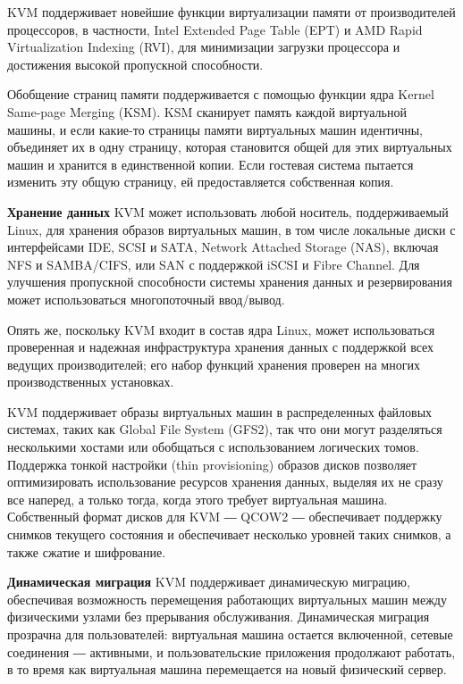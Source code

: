 KVM поддерживает новейшие функции виртуализации памяти от производителей процессоров, в частности, Intel Extended Page Table (EPT) и AMD Rapid Virtualization Indexing (RVI), для минимизации загрузки процессора и достижения высокой пропускной способности.

Обобщение страниц памяти поддерживается с помощью функции ядра Kernel Same-page Merging (KSM). KSM сканирует память каждой виртуальной машины, и если какие-то страницы памяти виртуальных машин идентичны, объединяет их в одну страницу, которая становится общей для этих виртуальных машин и хранится в единственной копии. Если гостевая система пытается изменить эту общую страницу, ей предоставляется собственная копия.

\textbf{Хранение данных}
KVM может использовать любой носитель, поддерживаемый Linux, для хранения образов виртуальных машин, в том числе локальные диски с интерфейсами IDE, SCSI и SATA, Network Attached Storage (NAS), включая NFS и SAMBA/CIFS, или SAN с поддержкой iSCSI и Fibre Channel. Для улучшения пропускной способности системы хранения данных и резервирования может использоваться многопоточный ввод/вывод.

Опять же, поскольку KVM входит в состав ядра Linux, может использоваться проверенная и надежная инфраструктура хранения данных с поддержкой всех ведущих производителей; его набор функций хранения проверен на многих производственных установках.

KVM поддерживает образы виртуальных машин в распределенных файловых системах, таких как Global File System (GFS2), так что они могут разделяться несколькими хостами или обобщаться с использованием логических томов. Поддержка тонкой настройки (thin provisioning) образов дисков позволяет оптимизировать использование ресурсов хранения данных, выделяя их не сразу все наперед, а только тогда, когда этого требует виртуальная машина. Собственный формат дисков для KVM ― QCOW2 ― обеспечивает поддержку снимков текущего состояния и обеспечивает несколько уровней таких снимков, а также сжатие и шифрование.

\textbf{Динамическая миграция}
KVM поддерживает динамическую миграцию, обеспечивая возможность перемещения работающих виртуальных машин между физическими узлами без прерывания обслуживания. Динамическая миграция прозрачна для пользователей: виртуальная машина остается включенной, сетевые соединения ― активными, и пользовательские приложения продолжают работать, в то время как виртуальная машина перемещается на новый физический сервер.

